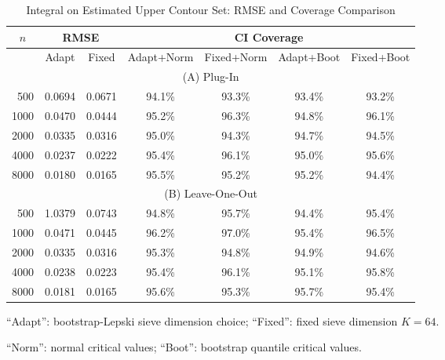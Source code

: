 \documentclass[12pt,american]{article}
\theoremstyle{definition}
\theoremstyle{plain}
\theoremstyle{definition}
\theoremstyle{plain}
\theoremstyle{plain}
\theoremstyle{plain}
\theoremstyle{plain}
\theoremstyle{plain}
\begin{document}
\begin{table}[h!]
  \centering
  \caption{Integral on Estimated Upper Contour Set: RMSE and Coverage Comparison}
  \label{tab:Sim2_Disk_Comp}
  \begin{threeparttable}
    \begin{tabular}{r|cc|cccc}
      \toprule
      \multicolumn{1}{c}{$n$ }  & \multicolumn{2}{c}{RMSE}   & \multicolumn{4}{c}{CI Coverage} \\
      \midrule
      & Adapt & Fixed & Adapt+Norm  & Fixed+Norm  & Adapt+Boot & Fixed+Boot \\
      \midrule
      \multicolumn{7}{c}{(A) Plug-In} \\
      \midrule
      500  & 0.0694 & 0.0671 & 94.1\% & 93.3\% & 93.4\% & 93.2\%\\
      1000 & 0.0470 & 0.0444 & 95.2\% & 96.3\% & 94.8\% & 96.1\%\\
      2000 & 0.0335 & 0.0316 & 95.0\% & 94.3\% & 94.7\% & 94.5\%\\
      4000 & 0.0237 & 0.0222 & 95.4\% & 96.1\% & 95.0\% & 95.6\% \\
      8000 & 0.0180 & 0.0165 & 95.5\% & 95.2\% & 95.2\% & 94.4\%\\
      \midrule
      \multicolumn{7}{c}{(B) Leave-One-Out} \\
      \midrule
      500  & 1.0379 & 0.0743 & 94.8\% & 95.7\%  & 94.4\% & 95.4\%\\
      1000 & 0.0471 & 0.0445 & 96.2\% & 97.0\%  & 95.4\% & 96.5\%\\
      2000 & 0.0335 & 0.0316 & 95.3\% & 94.8\%  & 94.9\% & 94.6\%\\
      4000 & 0.0238 & 0.0223 & 95.4\% & 96.1\%  & 95.1\% & 95.8\%\\
      8000 & 0.0181 & 0.0165 & 95.6\% & 95.3\%  & 95.7\% & 95.4\%\\
      \bottomrule
    \end{tabular}
    \begin{tablenotes}
      \footnotesize
    \item ``Adapt'': bootstrap-Lepski sieve dimension choice; ``Fixed'': fixed sieve dimension $K=64$.
    \item ``Norm'': normal critical values; ``Boot'': bootstrap quantile critical values.
    \end{tablenotes}
  \end{threeparttable}
\end{table}



\end{document}
